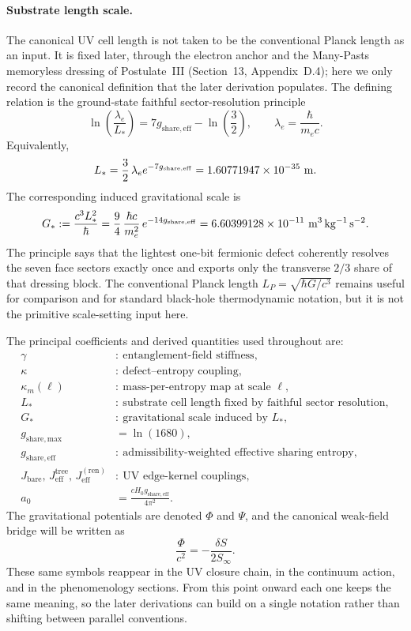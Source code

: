 \documentclass[11pt]{article}
\begin{document}
\paragraph{Substrate length scale.}
The canonical UV cell length is not taken to be the conventional Planck length as an input. It is fixed later, through the electron anchor and the Many-Pasts memoryless dressing of Postulate~III (Section~13, Appendix~D.4); here we only record the canonical definition that the later derivation populates. The defining relation is the ground-state faithful sector-resolution principle
\[
\ln\!\left(\frac{\lambda_e}{L_*}\right)
=
7g_{\mathrm{share,eff}}-\ln\!\left(\frac32\right),
\qquad
\lambda_e=\frac{\hbar}{m_ec}.
\]
Equivalently,
\[
L_*=\frac32\,\lambda_e e^{-7g_{\mathrm{share,eff}}}
=
1.60771947\times10^{-35}\ {\rm m}.
\]
The corresponding induced gravitational scale is
\[
G_*:=\frac{c^3L_*^2}{\hbar}
=
\frac94\,\frac{\hbar c}{m_e^2}\,e^{-14g_{\mathrm{share,eff}}}
=
6.60399128\times10^{-11}\ {\rm m^3\,kg^{-1}\,s^{-2}}.
\]
The principle says that the lightest one-bit fermionic defect coherently resolves the seven face sectors exactly once and exports only the transverse $2/3$ share of that dressing block. The conventional Planck length $L_P=\sqrt{\hbar G/c^3}$ remains useful for comparison and for standard black-hole thermodynamic notation, but it is not the primitive scale-setting input here.

The principal coefficients and derived quantities used throughout are:
\begin{align}
\gamma &:\ \text{entanglement-field stiffness},\\
\kappa &:\ \text{defect--entropy coupling},\\
\kappa_m(\ell) &:\ \text{mass-per-entropy map at scale }\ell,\\
L_* &:\ \text{substrate cell length fixed by faithful sector resolution},\\
G_* &:\ \text{gravitational scale induced by }L_*,\\
g_{\mathrm{share,max}} &= \ln(1680),\\
g_{\mathrm{share,eff}} &:\ \text{admissibility-weighted effective sharing entropy},\\
J_{\mathrm{bare}},\,J_{\mathrm{eff}}^{\mathrm{tree}},\,J_{\mathrm{eff}}^{(\mathrm{ren})} &:\ \text{UV edge-kernel couplings},\\
a_0 &= \frac{cH_0g_{\mathrm{share,eff}}}{4\pi^2}.
\end{align}
The gravitational potentials are denoted $\Phi$ and $\Psi$, and the canonical weak-field bridge will be written as
\[
\frac{\Phi}{c^2}=-\frac{\delta S}{2S_\infty}.
\]
These same symbols reappear in the UV closure chain, in the continuum action, and in the phenomenology sections. From this point onward each one keeps the same meaning, so the later derivations can build on a single notation rather than shifting between parallel conventions.
\end{document}
